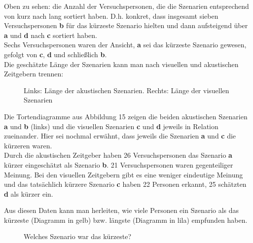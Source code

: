 \documentclass{Paper}
\begin{document}
Oben zu sehen: die Anzahl der Versuchspersonen, die die Szenarien entsprechend von kurz nach lang sortiert haben. D.h. konkret, dass insgesamt sieben Versuchspersonen   \textbf{b} für das kürzeste Szenario hielten und dann aufsteigend über \textbf{a} und \textbf{d} nach  \textbf{c} sortiert haben. \\
Sechs Versuchspersonen waren der Ansicht, \textbf{a} sei das kürzeste Szenario gewesen, gefolgt von \textbf{c}, \textbf{d} und schließlich \textbf{b}.\\

Die geschätzte Länge der Szenarien kann man nach visuellen und akustischen Zeitgebern trennen:

       
\begin{figure}[H]
\caption{Links: Länge der akustischen Szenarien. Rechts: Länge der visuellen Szenarien}
\label{SzenarienVisuellAkustisch}
\end{figure} %
       
        Die Tortendiagramme aus Abbildung 15 zeigen die beiden akustischen Szenarien \textbf{a} und \textbf{b} (links) und die visuellen Szenarien \textbf{c} und \textbf{d} jeweils in Relation zueinander. Hier sei nochmal erwähnt, dass jeweils die Szenarien \textbf{a} und \textbf{c} die kürzeren waren.\\
Durch die akustischen Zeitgeber haben 26 Versuchspersonen das Szenario \textbf{a} kürzer eingeschätzt als Szenario \textbf{b}. 21 Versuchspersonen waren gegenteiliger Meinung. Bei den visuellen Zeitgebern gibt es eine weniger eindeutige Meinung und das tatsächlich kürzere Szenario \textbf{c} haben 22 Personen erkannt, 25 schätzten \textbf{d} als kürzer ein.
       
       
Aus diesen Daten kann man herleiten, wie viele Personen ein Szenario als das kürzeste (Diagramm in gelb) bzw. längste (Diagramm in lila) empfunden haben.

\begin{figure}[ht]
\caption{Welches Szenario war das kürzeste?}
\label{SzenarienKurz}
\end{figure}
       
\end{document}
